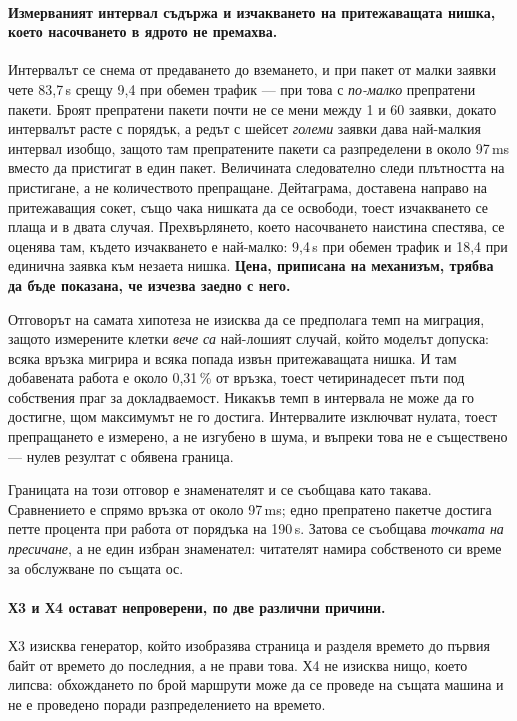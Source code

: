 \paragraph{Измерваният интервал съдържа и изчакването на притежаващата нишка, което насочването в
ядрото не премахва.} Интервалът се снема от предаването до вземането, и при пакет от малки заявки
чете 83,7\,\textmu s срещу 9,4 при обемен трафик — при това с \emph{по-малко} препратени пакети.
Броят препратени пакети почти не се мени между 1 и 60 заявки, докато интервалът расте с порядък, а
редът с шейсет \emph{големи} заявки дава най-малкия интервал изобщо, защото там препратените пакети
са разпределени в около 97\,ms вместо да пристигат в един пакет. Величината следователно следи
плътността на пристигане, а не количеството препращане.
Дейтаграма, доставена направо на притежаващия сокет, също чака нишката да се освободи, тоест
изчакването се плаща и в двата случая. Прехвърлянето, което насочването наистина спестява, се оценява
там, където изчакването е най-малко: 9,4\,\textmu s при обемен трафик и 18,4 при единична заявка към
незаета нишка. \textbf{Цена, приписана на механизъм, трябва да бъде показана, че изчезва заедно с
него.}

Отговорът на самата хипотеза не изисква да се предполага темп на миграция, защото измерените клетки
\emph{вече са} най-лошият случай, който моделът допуска: всяка връзка мигрира и всяка попада извън
притежаващата нишка. И там добавената работа е около 0,31\,\% от връзка, тоест четиринадесет пъти под
собствения праг за докладваемост. Никакъв темп в интервала не може да го достигне, щом максимумът не
го достига. Интервалите изключват нулата, тоест препращането е измерено, а не изгубено в шума, и
въпреки това не е съществено — нулев резултат с обявена граница.

Границата на този отговор е знаменателят и се съобщава като такава. Сравнението е спрямо връзка от
около 97\,ms; едно препратено пакетче достига петте процента при работа от порядъка на 190\,\textmu s.
Затова се съобщава \emph{точката на пресичане}, а не един избран знаменател: читателят намира
собственото си време за обслужване по същата ос.

\paragraph{Х3 и Х4 остават непроверени, по две различни причини.} Х3 изисква генератор, който
изобразява страница и разделя времето до първия байт от времето до последния, а  не
прави това. Х4 не изисква нищо, което липсва: обхождането по брой маршрути може да се проведе на
същата машина и не е проведено поради разпределението на времето.

